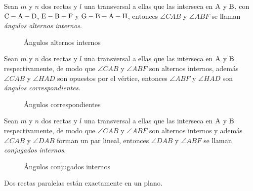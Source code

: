 \begin{definition}
    Sean $m$ y $n$ dos rectas y $l$ una transversal a ellas que las interseca en $\rm A$ y $\rm B$, con $\rm C-A-D$, $\rm E-B-F$ y $\rm G-B-A-H$, entonces $\angle{CAB}$ y $\angle{ABF}$ se llaman \textit{ángulos alternos internos}.

    \begin{figure}[!h]
        \centering
        
        \caption{Ángulos alternos internos}
        \label{fig:ang-alternos-internos}
    \end{figure}
    
\end{definition}

\clearpage

\begin{definition}
    Sean $m$ y $n$ dos rectas y $l$ una transversal a ellas que las interseca en $\rm A$ y $\rm B$ respectivamente, de modo que $\angle{CAB}$ y $\angle{ABF}$ son alternos internos, además $\angle{CAB}$ y $\angle{HAD}$ son opuestos por el vértice, entonces $\angle{ABF}$ y $\angle{HAD}$ son \textit{ángulos correspondientes}.

    \begin{figure}[!h]
        \centering
        
        \caption{Ángulos correspondientes}
        \label{fig:ang-correspondientes}
    \end{figure}
    
\end{definition}

\begin{definition}
    Sean $m$ y $n$ dos rectas y $l$ una transversal a ellas que las interseca en $\rm A$ y $\rm B$ respectivamente, de modo que $\angle{CAB}$ y $\angle{ABF}$ son alternos internos y además $\angle{CAB}$ y $\angle{DAB}$ forman un par lineal, entonces $\angle{DAB}$ y $\angle{ABF}$ se llaman \textit{conjugados internos}.

    \begin{figure}[!h]
        \centering
        
        \caption{Ángulos conjugados internos}
        \label{fig:ang-conjugados}
    \end{figure}
    
\end{definition}

\begin{theorem}
    Dos rectas paralelas están exactamente en un plano.
\end{theorem}

